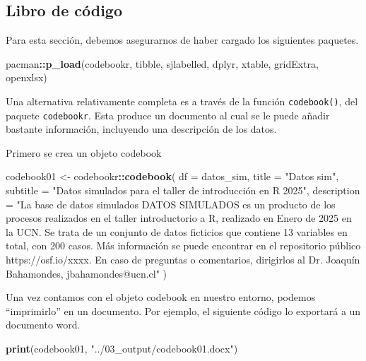 \documentclass[
]{book}
\newenvironment{Shaded}{\begin{snugshade}}{\end{snugshade}}
\newcommand{\AttributeTok}[1]{\textcolor[rgb]{0.13,0.29,0.53}{#1}}
\newcommand{\FunctionTok}[1]{\textcolor[rgb]{0.13,0.29,0.53}{\textbf{#1}}}
\newcommand{\NormalTok}[1]{#1}
\newcommand{\OtherTok}[1]{\textcolor[rgb]{0.56,0.35,0.01}{#1}}
\newcommand{\SpecialCharTok}[1]{\textcolor[rgb]{0.81,0.36,0.00}{\textbf{#1}}}
\newcommand{\StringTok}[1]{\textcolor[rgb]{0.31,0.60,0.02}{#1}}
\begin{document}
\subsection{Libro de código}\label{libro-de-cuxf3digo}

Para esta sección, debemos asegurarnos de haber cargado los siguientes paquetes.

\begin{Shaded}
\begin{Highlighting}[]
\NormalTok{pacman}\SpecialCharTok{::}\FunctionTok{p\_load}\NormalTok{(codebookr, tibble, sjlabelled, dplyr, xtable, gridExtra, openxlsx)}
\end{Highlighting}
\end{Shaded}

Una alternativa relativamente completa es a través de la función \texttt{codebook()}, del paquete \texttt{codebookr}. Esta produce un documento al cual se le puede añadir bastante información, incluyendo una descripción de los datos.

Primero se crea un objeto codebook

\begin{Shaded}
\begin{Highlighting}[]
\NormalTok{codebook01 }\OtherTok{\textless{}{-}}\NormalTok{ codebookr}\SpecialCharTok{::}\FunctionTok{codebook}\NormalTok{(}
  \AttributeTok{df =}\NormalTok{ datos\_sim,}
  \AttributeTok{title =} \StringTok{"Datos sim"}\NormalTok{,}
  \AttributeTok{subtitle =} \StringTok{"Datos simulados para el taller de introducción en R 2025"}\NormalTok{,}
  \AttributeTok{description =} \StringTok{"La base de datos simulados DATOS SIMULADOS es un producto de los procesos realizados en el taller introductorio a R, realizado en Enero de 2025 en la UCN. Se trata de un conjunto de datos ficticios que contiene 13 variables en total, con 200 casos. Más información se puede encontrar en el repositorio público https://osf.io/xxxx. En caso de preguntas o comentarios, dirigirlos al Dr. Joaquín Bahamondes, jbahamondes@ucn.cl"}
\NormalTok{)}
\end{Highlighting}
\end{Shaded}

Una vez contamos con el objeto codebook en nuestro entorno, podemos ``imprimirlo'' en un documento. Por ejemplo, el siguiente código lo exportará a un documento word.

\begin{Shaded}
\begin{Highlighting}[]
\FunctionTok{print}\NormalTok{(codebook01, }\StringTok{"../03\_output/codebook01.docx"}\NormalTok{)}
\end{Highlighting}
\end{Shaded}
\end{document}
